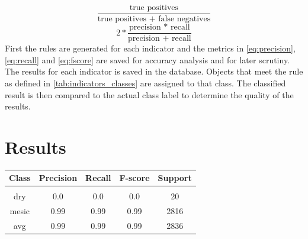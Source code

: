 \documentclass[authoryear,review,12pt,number]{elsarticle}
\begin{document}
\begin{equation}\label{eq:recall}
    \frac{\text{true positives}}{\text{true positives + false negatives}}
\end{equation}
\begin{equation}\label{eq:fscore}
    2 * \frac{\text{precision * recall}}{\text{precision + recall}}
\end{equation}
First the rules are generated for each indicator and the metrics in 
\ref{eq:precision}, \ref{eq:recall} and \ref{eq:fscore} are saved for accuracy 
analysis and for later scrutiny. The results for each indicator is saved in the 
database. Objects that meet the rule as defined in \ref{tab:indicators_classes} 
are assigned to that class. The classified result is then compared to the 
actual class label to determine the quality of the results.


\section{Results}

\begin{tabular}{c | c c c c}
Class & Precision & Recall & F-score & Support\\
\hline
\hline\\
dry & 0.0 & 0.0 & 0.0 & 20\\
mesic & 0.99 & 0.99 & 0.99 & 2816\\
avg & 0.99 & 0.99 & 0.99 & 2836\\
\end{tabular}

\end{document}
